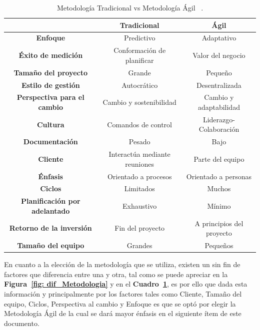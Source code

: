 \begin{table}[h]
    \caption{\label{tab: tab_dif_Metodologia} Metodología Tradicional vs Metodología Ágil ~\cite{5}. }
  
    \begin{tabular}{|c||cc|}
    \hline
      & \textbf{Tradicional} & \textbf{Ágil} \\
    
    \hline\hline
    
    \textbf{Enfoque} & Predictivo & Adaptativo\\

    \textbf{Éxito de medición}   & Conformación de planificar & Valor del negocio\\

    \textbf{Tamaño del proyecto} & Grande & Pequeño\\

    \textbf{Estilo de gestión} & Autocrático & Desentralizada \\

    \textbf{Perspectiva para el cambio} & Cambio y sostenibilidad & Cambio y adaptabilidad\\

    \textbf{Cultura} & Comandos de control & Liderazgo-Colaboración\\

    \textbf{Documentación} & Pesado & Bajo\\

    \textbf{Cliente} & Interactúa mediante reuniones & Parte del equipo\\

    \textbf{Énfasis} & Orientado a procesos & Orientado a personas\\
    
    \textbf{Ciclos} & Limitados & Muchos\\
    
    \textbf{Planificación por adelantado} & Exhaustivo & Mínimo\\
    
    \textbf{Retorno de la inversión} & Fin del proyecto & A principios del proyecto\\

    \textbf{Tamaño del equipo} & Grandes & Pequeños\\\hline
    \end{tabular}  
\end{table}

En cuanto a la elección de la metodología que se utiliza, existen un sin fin de factores que diferencia entre una y otra, tal como se puede apreciar en la \textbf{Figura~\ref{fig: dif_Metodologia}}  y en el \textbf{Cuadro~\ref{tab: tab_dif_Metodologia}}, es por ello que dada esta información y principalmente por los factores tales como Cliente, Tamaño del equipo, Ciclos, Perspectiva al cambio y Enfoque es que se optó por elegir la Metodología Ágil de la cual se dará mayor énfasis en el siguiente ítem de este documento.






